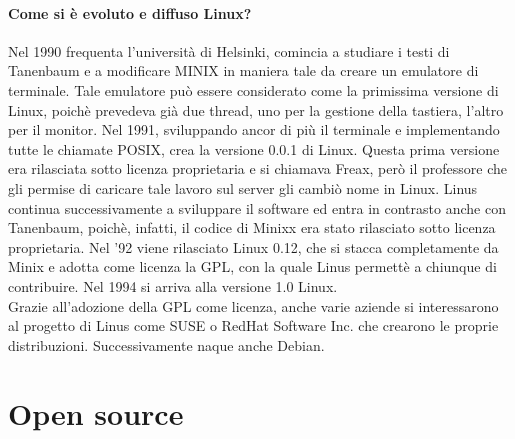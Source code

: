 \documentclass[a4paper]{article}
\begin{document}
		\paragraph{Come si è evoluto e diffuso Linux?}
		Nel 1990 frequenta l'università di Helsinki, comincia a studiare i testi di Tanenbaum e a modificare MINIX in maniera tale da creare un emulatore di terminale. Tale emulatore può essere considerato come la primissima versione di Linux, poichè prevedeva già due thread, uno per la gestione della tastiera, l'altro per il monitor. Nel 1991, sviluppando ancor di più il terminale e implementando tutte le chiamate POSIX, crea la versione 0.0.1 di Linux. Questa prima versione era rilasciata sotto licenza proprietaria e si chiamava Freax, però il professore che gli permise di caricare tale lavoro sul server gli cambiò nome in Linux. Linus continua successivamente a sviluppare il software ed entra in contrasto anche con Tanenbaum, poichè, infatti, il codice di Minixx era stato rilasciato sotto licenza proprietaria. Nel '92 viene rilasciato Linux 0.12, che si stacca completamente da Minix e adotta come licenza la GPL, con la quale Linus permettè a chiunque di contribuire. Nel 1994 si arriva alla versione 1.0 Linux. \\
		Grazie all'adozione della GPL come licenza, anche varie aziende si interessarono al progetto di Linus come SUSE o RedHat Software Inc. che crearono le proprie distribuzioni. Successivamente naque anche Debian. 
	
	\section{Open source}	
\end{document}
